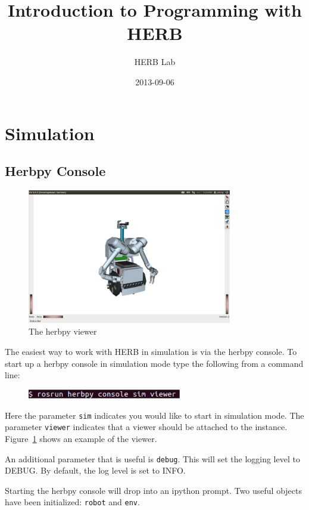 \documentclass[11pt, oneside]{article}
\title{Introduction to Programming with HERB}
\author{HERB Lab}
\date{2013-09-06} %
\begin{document}
\maketitle


\section{Simulation}

\subsection{Herbpy Console}
\begin{figure}[htbp]
   \centering
   \includegraphics[width=0.8\textwidth]{figs/viewer.jpg} %
   \caption{The herbpy viewer}
   \label{fig:viewer}
\end{figure}
The easiest way to work with HERB in simulation is via the herbpy console.  To start up a herbpy console in simulation mode type the following from a command line:
\begin{figure}[h]
\centering
\includegraphics[width=0.6\textwidth]{figs/herbpystart.jpg}
\end{figure}
Here the parameter \texttt{sim} indicates you would like to start in simulation mode. The parameter \texttt{viewer} indicates that a viewer should be attached to the instance.  Figure~\ref{fig:viewer} shows an example of the viewer.  

An additional parameter that is useful is \texttt{debug}.  This will set the logging level to DEBUG.  By default, the log level is set to INFO.

Starting the herbpy console will drop into an ipython prompt.  Two useful objects have been initialized: \texttt{robot} and \texttt{env}. 
\end{document}
